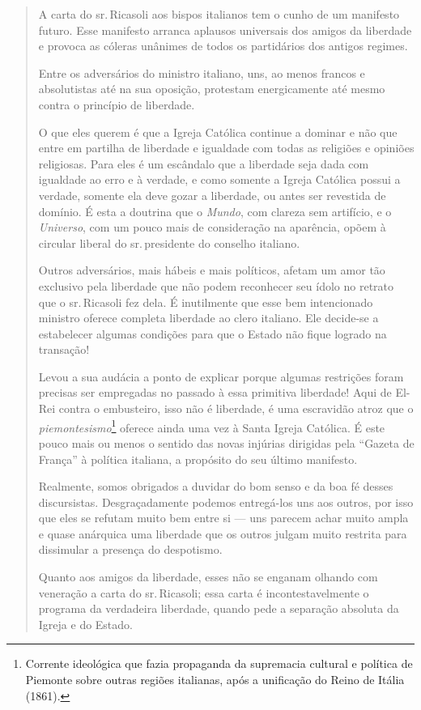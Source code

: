 \begin{quote} %
A carta do sr.\,Ricasoli aos bispos italianos tem o cunho de um
manifesto futuro. Esse manifesto arranca aplausos universais dos amigos
da liberdade e provoca as cóleras unânimes de todos os partidários dos
antigos regimes.

Entre os adversários do ministro italiano, uns, ao menos francos e
absolutistas até na sua oposição, protestam energicamente até mesmo
contra o princípio de liberdade.

O que eles querem é que a Igreja Católica continue a dominar e não que
entre em partilha de liberdade e igualdade com todas as religiões e
opiniões religiosas. Para eles é um escândalo que a liberdade seja dada
com igualdade ao erro e à verdade, e como somente a Igreja Católica
possui a verdade, somente ela deve gozar a liberdade, ou antes ser
revestida de domínio. É esta a doutrina que o \emph{Mundo}, com clareza
sem artifício, e o \emph{Universo}, com um pouco mais de consideração na
aparência, opõem à circular liberal do sr.\,presidente do conselho
italiano.

Outros adversários, mais hábeis e mais políticos, afetam um amor tão
exclusivo pela liberdade que não podem reconhecer seu ídolo no retrato
que o sr.\,Ricasoli fez dela. É inutilmente que esse bem intencionado
ministro oferece completa liberdade ao clero italiano. Ele decide-se a
estabelecer algumas condições para que o Estado não fique logrado na
transação!

Levou a sua audácia a ponto de explicar porque algumas restrições foram
precisas ser empregadas no passado à essa primitiva liberdade! Aqui de
El-Rei contra o embusteiro, isso não é liberdade, é uma escravidão atroz
que o \emph{piemontesismo}\footnote{Corrente ideológica que fazia
  propaganda da supremacia cultural e política de Piemonte sobre outras
  regiões italianas, após a unificação do Reino de Itália (1861).}
oferece ainda uma vez à Santa Igreja Católica. É este pouco mais ou
menos o sentido das novas injúrias dirigidas pela ``Gazeta de França'' à
política italiana, a propósito do seu último manifesto.

Realmente, somos obrigados a duvidar do bom senso e da boa fé desses
discursistas. Desgraçadamente podemos entregá-los uns aos outros, por
isso que eles se refutam muito bem entre si --- uns parecem achar muito
ampla e quase anárquica uma liberdade que os outros julgam muito
restrita para dissimular a presença do despotismo.

Quanto aos amigos da liberdade, esses não se enganam olhando com
veneração a carta do sr.\,Ricasoli; essa carta é incontestavelmente o
programa da verdadeira liberdade, quando pede a separação absoluta da
Igreja e do Estado.


\end{quote}
